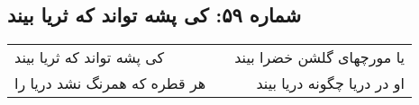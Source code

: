 \begin{center}
\section*{شماره ۵۹: کی پشه تواند که ثریا بیند}
\label{sec:059}
\begin{longtable}{l p{0.5cm} r}
کی پشه تواند که ثریا بیند
&&
یا مورچهای گلشن خضرا بیند
\\
هر قطره که همرنگ نشد دریا را
&&
او در دریا چگونه دریا بیند
\\
\end{longtable}
\end{center}
